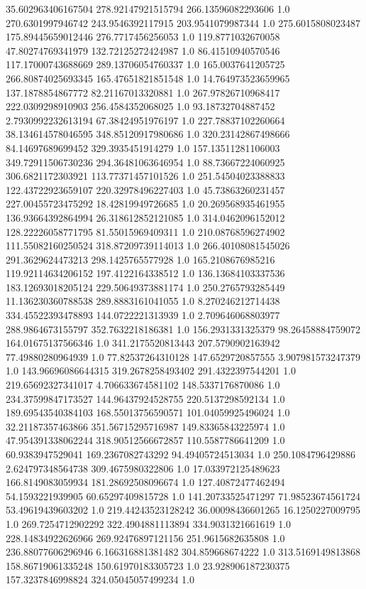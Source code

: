 35.602963406167504	278.92147921515794	266.13596082293606	1.0
270.6301997946742	243.9546392117915	203.9541079987344	1.0
275.6015808023487	175.89445659012446	276.7717456256053	1.0
119.8771032670058	47.80274769341979	132.72125272424987	1.0
86.41510940570546	117.17000743688669	289.13706054760337	1.0
165.0037641205725	266.80874025693345	165.47651821851548	1.0
14.764973523659965	137.1878854867772	82.21167013320881	1.0
267.97826710968417	222.0309298910903	256.4584352068025	1.0
93.18732704887452	2.7930992232613194	67.38424951976197	1.0
227.78837102260664	38.134614578046595	348.85120917980686	1.0
320.23142867498666	84.14697689699452	329.3935451914279	1.0
157.13511281106003	349.72911506730236	294.36481063646954	1.0
88.73667224060925	306.6821172303921	113.77371457101526	1.0
251.54504023388833	122.43722923659107	220.32978496227403	1.0
45.73863260231457	227.00455723475292	18.42819949726685	1.0
20.269568935461955	136.93664392864994	26.318612852121085	1.0
314.0462096152012	128.22226058771795	81.55015969409311	1.0
210.08768596274902	111.55082160250524	318.87209739114013	1.0
266.40108081545026	291.3629624473213	298.1425765577928	1.0
165.2108676985216	119.92114634206152	197.4122164338512	1.0
136.13684103337536	183.12693018205124	229.50649373881174	1.0
250.2765793285449	11.136230360788538	289.8883161041055	1.0
8.270246212714438	334.45522393478893	144.0722221313939	1.0
2.709646068803977	288.9864673155797	352.7632218186381	1.0
156.2931331325379	98.26458884759072	164.01675137566346	1.0
341.2175520813443	207.5790902163942	77.49880280964939	1.0
77.82537264310128	147.6529720857555	3.907981573247379	1.0
143.96696086644315	319.2678258493402	291.4322397544201	1.0
219.65692327341017	4.706633674581102	148.5337176870086	1.0
234.37599847173527	144.96437924528755	220.5137298592134	1.0
189.69543540384103	168.55013756590571	101.04059925496024	1.0
32.21187357463866	351.56715295716987	149.83365843225974	1.0
47.954391338062244	318.90512566672857	110.5587786641209	1.0
60.9383947529041	169.2367082743292	94.49405724513034	1.0
250.1084796429886	2.624797348564738	309.4675980322806	1.0
17.033972125489623	166.8149083059934	181.28692508096674	1.0
127.40872477462494	54.1593221939905	60.65297409815728	1.0
141.20733525471297	71.98523674561724	53.49619439603202	1.0
219.44243523128242	36.00098436601265	16.1250227009795	1.0
269.7254712902292	322.4904881113894	334.9031321661619	1.0
228.14834922626966	269.92476897121156	251.9615682635808	1.0
236.88077606296946	6.166316881381482	304.859668674222	1.0
313.5169149813868	158.86719061335248	150.61970183305723	1.0
23.928906187230375	157.3237846998824	324.05045057499234	1.0
